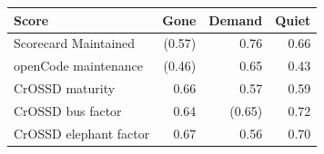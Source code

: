 \begin{tabular}{lrrr}
\toprule
Score & Gone & Demand & Quiet \\
\midrule
Scorecard Maintained & (0.57) & 0.76 & 0.66 \\
openCode maintenance & (0.46) & 0.65 & 0.43 \\
CrOSSD maturity & 0.66 & 0.57 & 0.59 \\
CrOSSD bus factor & 0.64 & (0.65) & 0.72 \\
CrOSSD elephant factor & 0.67 & 0.56 & 0.70 \\
\bottomrule
\end{tabular}
